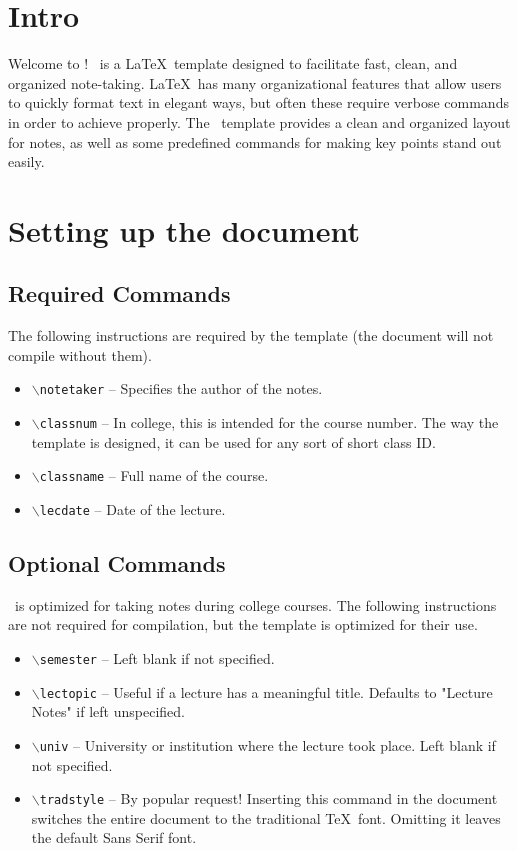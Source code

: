 \documentclass{ClassTeX}
\begin{document}
	\maketitle
	\section{Intro}
	Welcome to \ClassTeX!  \ClassTeX\ is a \LaTeX\ template designed to facilitate fast, clean, and organized note-taking.  \LaTeX\ has many organizational features that allow users to quickly format text in elegant ways, but often these require verbose commands in order to achieve properly.  The \ClassTeX\ template provides a clean and organized layout for notes, as well as some predefined commands for making key points stand out easily.
	
	\section{Setting up the document}
	
	\subsection{Required Commands}
	The following instructions are required by the template (the document will not compile without them).
	\begin{itemize}
		\item \texttt{$\backslash$notetaker} -- Specifies the author of the notes.
		\item \texttt{$\backslash$classnum} -- In college, this is intended for the course number.  The way the template is designed, it can be used for any sort of short class ID.
		\item \texttt{$\backslash$classname} -- Full name of the course.
		\item \texttt{$\backslash$lecdate} -- Date of the lecture.
	\end{itemize}
	
	\subsection{Optional Commands}
	\ClassTeX\ is optimized for taking notes during college courses.  The following instructions are not required for compilation, but the template is optimized for their use.
	\begin{itemize}
		\item \texttt{$\backslash$semester} -- Left blank if not specified.
		\item \texttt{$\backslash$lectopic} -- Useful if a lecture has a meaningful title.  Defaults to "Lecture Notes" if left unspecified.
		\item \texttt{$\backslash$univ} -- University or institution where the lecture took place.  Left blank if not specified.
		\item \texttt{$\backslash$tradstyle} -- By popular request!  Inserting this command in the document switches the entire document to the traditional \TeX\ font.  Omitting it leaves the default Sans Serif font.
	\end{itemize}
\end{document}
